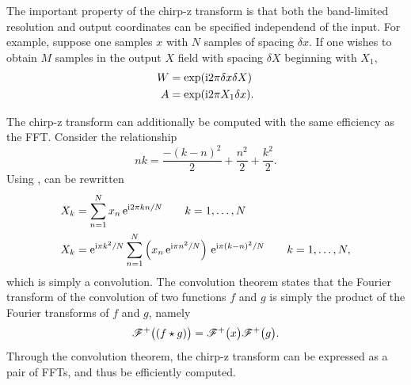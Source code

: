 The important property of the chirp-z transform is that both the
band-limited resolution and output coordinates can be specified independend of the input.
For example, suppose one samples $x$ with $N$ samples
of spacing $\delta x$.  If one wishes to obtain $M$ samples in the output
$X$ field with spacing $\delta X$ beginning with $X_1$, 
\begin{align}
								W&=\exp({\mathrm{i}} 2 \pi \delta x \delta X)\\
								A&=\exp({\mathrm{i}} 2 \pi X_1 \delta x).
\end{align}

The chirp-z transform can additionally be computed with the same efficiency
as the FFT.  Consider the relationship
\begin{equation}
n k = \frac{-(k-n)^2}{2} + \frac{n^2}{2} + \frac{k^2}{2}.
\label{eqn:relationshipfargodingus}
\end{equation}
Using ,  can be rewritten
\begin{align}
								X_k &= \sum_{n=1}^{N} x_n\, {\mathrm{e}}^{{\mathrm{i}} 2\pi k n/N} \qquad k=1,\ldots,N\\
								X_k &= {\mathrm{e}}^{{\mathrm{i}} \pi k^2/N} \sum_{n=1}^{N} \left(x_n\, {\mathrm{e}}^{{\mathrm{i}} \pi n^2/N}\right)\,
								{\mathrm{e}}^{{\mathrm{i}} \pi(k-n)^2/N}\qquad k=1,\ldots,N,
\end{align}
which is simply a convolution.  The convolution theorem 
states that the Fourier transform of the
convolution of two functions $f$ and $g$ is simply the product of the
Fourier transforms of $f$ and $g$, namely
\begin{equation}
{\mathscr{F}^{+}\bigl(\left(f \star g\right)\bigr)} = {\mathscr{F}^{+}\bigl(x\bigr)}{\mathscr{F}^{+}\bigl(g\bigr)}.
\end{equation}
Through the convolution theorem, the chirp-z transform can be expressed as
a pair of FFTs, and thus be efficiently computed.
